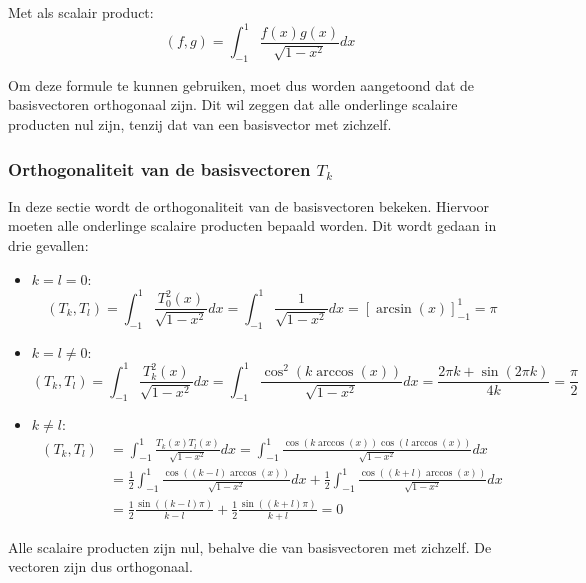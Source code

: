 \documentclass[a4paper, 12pt, titlepage, fleqn]{article}
\begin{document}
Met als scalair product:
\begin{equation*}
(f,g) = \int_{-1}^1\frac{f(x)g(x)}{\sqrt{1-x^2}}dx
\end{equation*}

Om deze formule te kunnen gebruiken, moet dus worden aangetoond dat de basisvectoren orthogonaal zijn. Dit wil zeggen dat alle onderlinge scalaire producten nul zijn, tenzij dat van een basisvector met zichzelf. 

\subsubsection{Orthogonaliteit van de basisvectoren $T_k$}
\label{subsec:scalaireProducten}
In deze sectie wordt de orthogonaliteit van de basisvectoren bekeken. Hiervoor moeten alle onderlinge scalaire producten bepaald worden. Dit wordt gedaan in drie gevallen:
\begin{itemize}
\item $k = l = 0$:
\begin{equation*}
(T_k,T_l) = \int_{-1}^1 \frac{T_0^2(x)}{\sqrt{1-x^2}}dx = \int_{-1}^1 \frac{1}{\sqrt{1-x^2}}dx =\left[\arcsin(x)\right]_{-1}^1 = \pi
\end{equation*}
\item $k = l \neq 0$:
\begin{equation*}
(T_k,T_l) = \int_{-1}^1\frac{T_k^2(x)}{\sqrt{1-x^2}}dx = \int_{-1}^1\frac{\cos^2(k \arccos(x))}{\sqrt{1-x^2}}dx = \frac{2\pi k + \sin(2\pi k)}{4k} = \frac{\pi}{2}
\end{equation*}
\item $k \neq l$:
\begin{align*}
(T_k,T_l) &= \int_{-1}^1\frac{T_k(x)T_l(x)}{\sqrt{1-x^2}}dx = \int_{-1}^1\frac{\cos(k \arccos(x))\cos(l \arccos(x))}{\sqrt{1-x^2}}dx\\
&=\frac{1}{2}\int_{-1}^1\frac{\cos((k-l)\arccos(x))}{\sqrt{1-x^2}}dx + \frac{1}{2}\int_{-1}^1\frac{\cos((k+l)\arccos(x))}{\sqrt{1-x^2}}dx\\
&=\frac{1}{2}\frac{\sin((k-l)\pi)}{k-l} + \frac{1}{2}\frac{\sin((k+l)\pi)}{k+l} = 0
\end{align*}
\end{itemize}
Alle scalaire producten zijn nul, behalve die van basisvectoren met zichzelf. De vectoren zijn dus orthogonaal.
\end{document}
